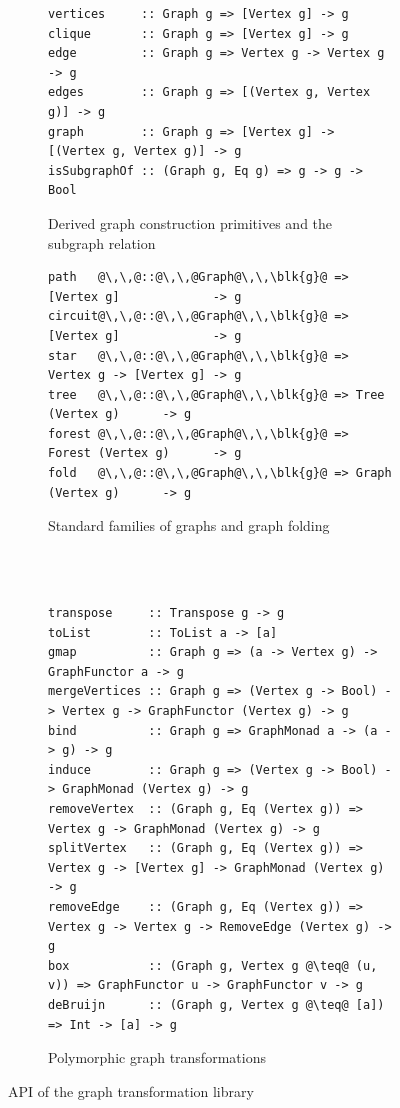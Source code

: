 \begin{figure}
\begin{subfigure}[b]{0.56\linewidth}
\begin{verbatim}
vertices     :: Graph g => [Vertex g] -> g
clique       :: Graph g => [Vertex g] -> g
edge         :: Graph g => Vertex g -> Vertex g -> g
edges        :: Graph g => [(Vertex g, Vertex g)] -> g
graph        :: Graph g => [Vertex g] -> [(Vertex g, Vertex g)] -> g
isSubgraphOf :: (Graph g, Eq g) => g -> g -> Bool
\end{verbatim}
\caption{Derived graph construction primitives and the subgraph relation}
\end{subfigure}
\hfill
\hfill
\vrule
\hfill
\hfill
\begin{subfigure}[b]{0.4\linewidth}
\begin{verbatim}
path   @\,\,@::@\,\,@Graph@\,\,\blk{g}@ => [Vertex g]             -> g
circuit@\,\,@::@\,\,@Graph@\,\,\blk{g}@ => [Vertex g]             -> g
star   @\,\,@::@\,\,@Graph@\,\,\blk{g}@ => Vertex g -> [Vertex g] -> g
tree   @\,\,@::@\,\,@Graph@\,\,\blk{g}@ => Tree   (Vertex g)      -> g
forest @\,\,@::@\,\,@Graph@\,\,\blk{g}@ => Forest (Vertex g)      -> g
fold   @\,\,@::@\,\,@Graph@\,\,\blk{g}@ => Graph  (Vertex g)      -> g
\end{verbatim}
\caption{Standard families of graphs and graph folding}
\end{subfigure}
~\\
~\\
\begin{subfigure}[b]{\linewidth}
\begin{verbatim}
transpose     :: Transpose g -> g
toList        :: ToList a -> [a]
gmap          :: Graph g => (a -> Vertex g) -> GraphFunctor a -> g
mergeVertices :: Graph g => (Vertex g -> Bool) -> Vertex g -> GraphFunctor (Vertex g) -> g
bind          :: Graph g => GraphMonad a -> (a -> g) -> g
induce        :: Graph g => (Vertex g -> Bool) -> GraphMonad (Vertex g) -> g
removeVertex  :: (Graph g, Eq (Vertex g)) => Vertex g -> GraphMonad (Vertex g) -> g
splitVertex   :: (Graph g, Eq (Vertex g)) => Vertex g -> [Vertex g] -> GraphMonad (Vertex g) -> g
removeEdge    :: (Graph g, Eq (Vertex g)) => Vertex g -> Vertex g -> RemoveEdge (Vertex g) -> g
box           :: (Graph g, Vertex g @\teq@ (u, v)) => GraphFunctor u -> GraphFunctor v -> g
deBruijn      :: (Graph g, Vertex g @\teq@ [a]) => Int -> [a] -> g
\end{verbatim}
\caption{Polymorphic graph transformations}
\end{subfigure}
\vspace{-3mm}
\caption{API of the graph transformation library\label{fig-api}}
\end{figure}

